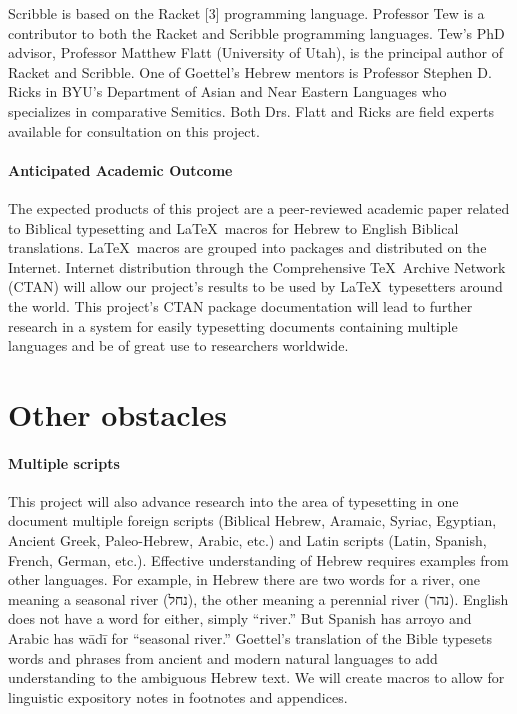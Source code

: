 \documentclass{acm_proc_article-sp}
\newcommand\Hebrew[1]{{\large\sblh #1}}
\begin{document}
Scribble is based on the Racket [3] programming language. Professor Tew is a contributor to both the Racket and Scribble programming languages. Tew's PhD advisor, Professor Matthew Flatt (University of Utah), is the principal author of Racket and Scribble. One of Goettel's Hebrew mentors is Professor Stephen D. Ricks in BYU's Department of Asian and Near Eastern Languages who specializes in comparative Semitics. Both Drs. Flatt and Ricks are field experts available for consultation on this project.

\paragraph{Anticipated Academic Outcome}
The expected products of this project are a peer-reviewed academic paper related to Biblical typesetting and \LaTeX\ macros for Hebrew to English Biblical translations. \LaTeX\ macros are grouped into packages and distributed on the Internet. Internet distribution through the Comprehensive \TeX\ Archive Network (CTAN) will allow our project's results to be used by \LaTeX\ typesetters around the world. This project's CTAN package documentation will lead to further research in a system for easily typesetting documents containing multiple languages and be of great use to researchers worldwide.

\section{Other obstacles}
\paragraph{Multiple scripts}
This project will also advance research into the area of typesetting in one document multiple foreign scripts (Biblical Hebrew, Aramaic, Syriac, Egyptian, Ancient Greek, Paleo-Hebrew, Arabic, etc.) and Latin scripts (Latin, Spanish, French, German, etc.). Effective understanding of Hebrew requires examples from other languages. For example, in Hebrew there are two words for a river, one meaning a seasonal river (\Hebrew{‫נחל‬}), the other meaning a perennial river (\Hebrew{‫נהר‬}). English does not have a word for either, simply ``river.'' But Spanish has arroyo and Arabic has wādī for ``seasonal river.'' Goettel's translation of the Bible typesets words and phrases from ancient and modern natural languages to add understanding to the ambiguous Hebrew text. We will create macros to allow for linguistic expository notes in footnotes and appendices.
\end{document}
